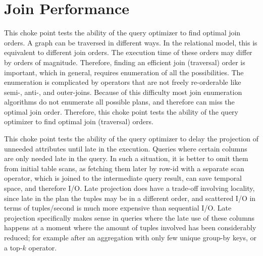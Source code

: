 


\section{Join Performance}



This choke point tests the ability of the query optimizer to find optimal join orders. A graph can be traversed in different ways. In the relational model, this is equivalent to different join orders.
The execution time of these orders may differ by orders of magnitude. Therefore, finding an efficient join (traversal) order is important, which in general, requires enumeration of all the possibilities.
The enumeration is complicated by operators that are not freely re-orderable like semi-, \mbox{anti-,} and outer-joins. Because of this difficulty most join enumeration algorithms do not enumerate all possible plans, and therefore can miss the optimal join order. Therefore, this choke point tests the ability of the query optimizer to find optimal join (traversal) orders.





This choke point tests the ability of the query optimizer to delay the projection of unneeded attributes until late in the execution. Queries where certain columns are only needed late in the query.
In such a situation, it is better to omit them from initial table scans, as fetching them later by row-id with a separate scan operator, which is joined to the intermediate query result, can save temporal space, and therefore I/O.
Late projection does have a trade-off involving locality, since late in the plan the tuples may be in a different order, and scattered I/O in terms of tuples/second is much more expensive than sequential I/O.
Late projection specifically makes sense in queries where the late use of these columns happens at a moment where the amount of tuples involved has been considerably reduced;
for example after an aggregation with only few unique group-by keys, or a top-$k$ operator.

